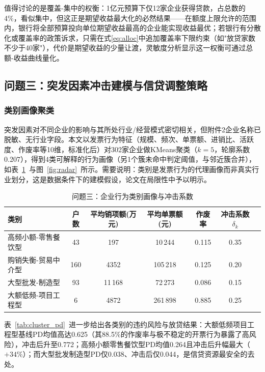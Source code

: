 \documentclass[12pt, a4paper]{article}
\begin{document}
值得讨论的是覆盖-集中的权衡：1亿元预算下仅12家企业获得贷款，占总数的4\%，看似集中，但这正是期望收益最大化的必然结果——在额度上限允许的范围内，银行将全部预算投向单位期望收益最高的企业能实现收益最优；若银行有分散化或覆盖率的政策诉求，只需在式\eqref{eq:alloc}中追加覆盖率下限约束（如"放贷家数不少于40家"），代价是期望收益的少量让渡，灵敏度分析显示这一权衡可通过总额-收益曲线量化。

\subsection{问题三：突发因素冲击建模与信贷调整策略}

\subsubsection{类别画像聚类}

突发因素对不同企业的影响与其所处行业/经营模式密切相关，但附件2企业名称已脱敏、无行业字段。本文以发票行为特征（规模、频次、单票额、进销比、活跃度、作废率等10维，标准化后）对302家企业做KMeans聚类（$k=5$，轮廓系数0.207），得到4类可解释的行为画像（另1个簇未命中判定阈值，与邻近簇合并），如表~\ref{tab:cluster}~与图~\ref{fig:radar}~所示。需要说明：类别是发票行为的代理画像而非真实行业划分，这是数据条件下的建模假设，论文在局限性中予以明示。

\begin{table}[H]
\centering
\caption{问题三：企业行为类别画像与冲击系数}
\label{tab:cluster}
{\small
\begin{tabular}{p{3.2cm}cccccc}
\toprule
\textbf{类别} & \textbf{户数} & \textbf{平均销项额(万元)} & \textbf{平均单票额(元)} & \textbf{作废率} & \textbf{冲击系数$\delta_k$} \\
\midrule
高频小额-零售餐饮型 & 43 & 197 & 10\,244 & 0.115 & 0.35 \\
购销失衡-贸易中介型 & 160 & 4352 & 105\,218 & 0.125 & 0.20 \\
大型批发-制造型 & 93 & 11\,168 & 72\,273 & 0.086 & 0.15 \\
大额低频-项目工程型 & 6 & 4872 & 261\,898 & 0.885 & 0.25 \\
\bottomrule
\end{tabular}}
\end{table}

表~\ref{tab:cluster_pd}~进一步给出各类别的违约风险与放贷结果：大额低频项目工程型基线PD均值高达0.625（其88.5\%的作废率与极不稳定的开票行为暴露了高风险），冲击后升至0.772；高频小额零售餐饮型PD均值0.264且冲击后升幅最大（$+34\%$）；而大型批发制造型PD仅0.038、冲击后仅0.044，是信贷资源最安全的去处。
\end{document}
